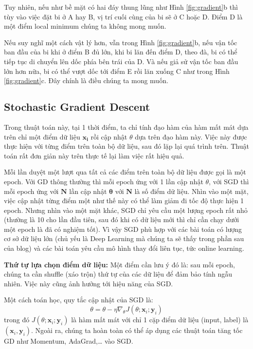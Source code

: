 Tuy nhiên, nếu như bề mặt có hai đáy thung lũng như Hình \ref{fig:gradient}b thì tùy vào việc đặt bi ở A hay B, vị trí cuối cùng của bi sẽ ở C hoặc D. Điểm D là một điểm local minimum chúng ta không mong muốn.

Nếu suy nghĩ một cách vật lý hơn, vẫn trong Hình \ref{fig:gradient}b, nếu vận tốc ban đầu của bi khi ở điểm B đủ lớn, khi bi lăn đến điểm D, theo đà, bi có thể tiếp tục di chuyển lên dốc phía bên trái của D. Và nếu giả sử vận tốc ban đầu lớn hơn nữa, bi có thể vượt dốc tới điểm E rồi lăn xuống C như trong Hình \ref{fig:gradient}c. Đây chính là điều chúng ta mong muốn.

\subsection{Stochastic Gradient Descent}
Trong thuật toán này, tại 1 thời điểm, ta chỉ tính đạo hàm của hàm mất mát dựa trên chỉ một điểm dữ liệu $\mathbf{x_i}$ rồi cập nhật 
$\theta$ dựa trên đạo hàm này. Việc này được thực hiện với từng điểm trên toàn bộ dữ liệu, sau đó lặp lại quá trình trên. Thuật toán rất đơn giản này trên thực tế lại làm việc rất hiệu quả.

Mỗi lần duyệt một lượt qua tất cả các điểm trên toàn bộ dữ liệu được gọi là một epoch. Với GD thông thường thì mỗi epoch ứng với 1 lần cập nhật $\theta$, với SGD thì mỗi epoch ứng với $\mathbf{N}$ lần cập nhật $\mathbf{\theta}$ với $\mathbf{N}$ là số điểm dữ liệu. Nhìn vào một mặt, việc cập nhật từng điểm một như thế này có thể làm giảm đi tốc độ thực hiện 1 epoch. Nhưng nhìn vào một mặt khác, SGD chỉ yêu cầu một lượng epoch rất nhỏ (thường là 10 cho lần đầu tiên, sau đó khi có dữ liệu mới thì chỉ cần chạy dưới một epoch là đã có nghiệm tốt). Vì vậy SGD phù hợp với các bài toán có lượng cơ sở dữ liệu lớn (chủ yếu là Deep Learning mà chúng ta sẽ thấy trong phần sau của blog) và các bài toán yêu cầu mô hình thay đổi liên tục, tức online learning.

\textbf{Thứ tự lựa chọn điểm dữ liệu:}
Một điểm cần lưu ý đó là: sau mỗi epoch, chúng ta cần shuffle (xáo trộn) thứ tự của các dữ liệu để đảm bảo tính ngẫu nhiên. Việc này cũng ảnh hưởng tới hiệu năng của SGD.

Một cách toán học, quy tắc cập nhật của SGD là:
$$\theta = \theta - \eta \nabla_{\theta} J(\theta; \mathbf{x}_i; \mathbf{y}_i)$$
trong đó $J(\theta; \mathbf{x}_i; \mathbf{y}_i)$ là hàm mất mát với chỉ 1 cặp điểm dữ liệu (input, label) là $(\mathbf{x}_i, \mathbf{y}_i)$. Ngoài ra, chúng ta hoàn toàn có thể áp dụng các thuật toán tăng tốc GD như Momentum, AdaGrad,… vào SGD.

